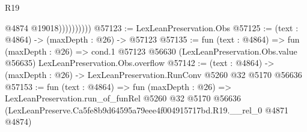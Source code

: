 \begin{lexlean}{R19}
\begin{coremodule}
                        @4874
                        @19018))))))))))
@57123 := LexLeanPreservation.Obs
@57125 := (text : @4864) -> (maxDepth : @26) -> @57123
@57135 := fun (text : @4864) =>
  fun (maxDepth : @26) =>
  cond.{1} @57123 @56630 (LexLeanPreservation.Obs.value @56635) LexLeanPreservation.Obs.overflow
@57142 := (text : @4864) -> (maxDepth : @26) -> LexLeanPreservation.RunConv @5260 @32 @5170 @56636
@57153 := fun (text : @4864) =>
  fun (maxDepth : @26) =>
  LexLeanPreservation.run_of_funRel
    @5260
    @32
    @5170
    @56636
    (LexLeanPreserve.Ca5fe8b9d64595a79eee4f004915717bd.R19.__rel_0 @4871 @4874)
\end{coremodule}
\end{lexlean}
